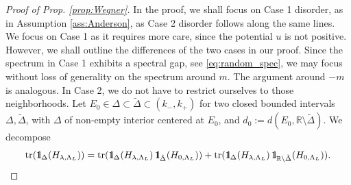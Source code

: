 \documentclass[reqno,12pt,letterpaper]{amsart}
\newcommand{\RR}{{\mathbb R}}
\numberwithin{equation}{section}
\DeclareMathOperator{\tr}{tr}
\def\indic{\operatorname{1\hskip-2.75pt\relax l}}
\begin{document}
 \begin{proof}[Proof of Prop. \ref{prop:Wegner}]
 In the proof, we shall focus on Case 1 disorder, as in Assumption \ref{ass:Anderson}, as Case 2 disorder follows along the same lines. We focus on Case 1 as it requires more care, since the potential $u$ is not positive. However, we shall outline the differences of the two cases in our proof. 
 Since the spectrum in Case 1 exhibits a spectral gap, see \eqref{eq:random_spec}, we may focus without loss of generality on the spectrum around $m$. The argument around $-m$ is analogous.  In Case 2, we do not have to restrict ourselves to those neighborhoods.
Let $E_0 \in \Delta \subset \tilde \Delta \subset(k_-,k_+)$ for two closed bounded intervals $\Delta,\tilde \Delta$, with $\Delta$ of non-empty interior centered at $E_0$, and $d_0 :=d(E_0,\RR \setminus \tilde \Delta)$.
We decompose
\begin{equation}
\label{eq:disjoint}
\tr(\indic_{\Delta}(H_{\lambda,\Lambda_L}) ) = \tr(\indic_{\Delta}(H_{\lambda,\Lambda_L}) \indic_{\tilde \Delta}(H_{0,\Lambda_L}) ) + \tr(\indic_{\Delta}(H_{\lambda,\Lambda_L}) \indic_{\RR \setminus \tilde \Delta}(H_{0,\Lambda_L}) ).
\end{equation}


\end{proof}
\end{document}
